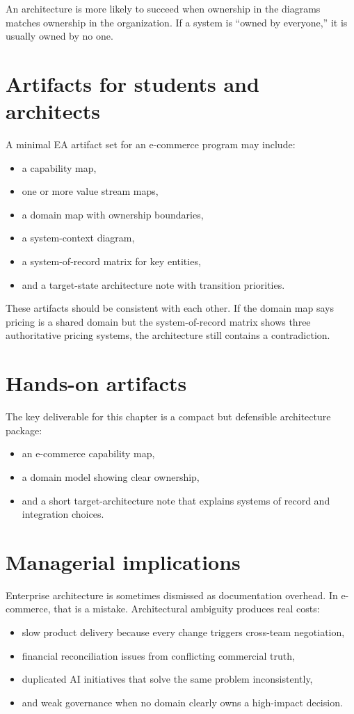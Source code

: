 An architecture is more likely to succeed when ownership in the diagrams matches ownership in the organization.
If a system is ``owned by everyone,'' it is usually owned by no one.

\section{Artifacts for students and architects}
A minimal EA artifact set for an e-commerce program may include:
\begin{itemize}
  \item a capability map,
  \item one or more value stream maps,
  \item a domain map with ownership boundaries,
  \item a system-context diagram,
  \item a system-of-record matrix for key entities,
  \item and a target-state architecture note with transition priorities.
\end{itemize}

These artifacts should be consistent with each other.
If the domain map says pricing is a shared domain but the system-of-record matrix shows three authoritative pricing systems, the architecture still contains a contradiction.

\section{Hands-on artifacts}
The key deliverable for this chapter is a compact but defensible architecture package:
\begin{itemize}
  \item an e-commerce capability map,
  \item a domain model showing clear ownership,
  \item and a short target-architecture note that explains systems of record and integration choices.
\end{itemize}

\section{Managerial implications}
Enterprise architecture is sometimes dismissed as documentation overhead.
In e-commerce, that is a mistake.
Architectural ambiguity produces real costs:
\begin{itemize}
  \item slow product delivery because every change triggers cross-team negotiation,
  \item financial reconciliation issues from conflicting commercial truth,
  \item duplicated AI initiatives that solve the same problem inconsistently,
  \item and weak governance when no domain clearly owns a high-impact decision.
\end{itemize}

